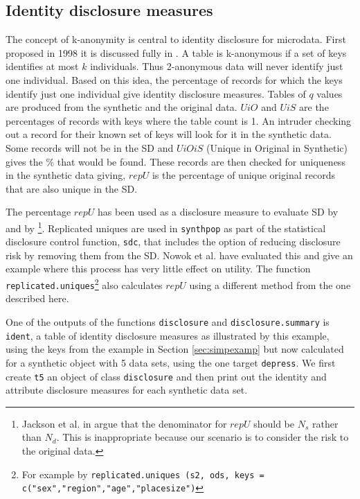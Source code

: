 \documentclass[12pt]{article}
\begin{document}
\subsection{Identity disclosure measures}\label{subsec:ident} 
The concept of k-anonymity is central to identity disclosure for microdata. First proposed in 1998 \cite{kanon1} it is discussed fully in \cite{elliotanonframe}. A table is k-anonymous if a set of keys identifies at most $k$ individuals. Thus 2-anonymous data will never identify just one individual. Based on this idea, the percentage of records for which the keys identify just one individual give identity disclosure measures. 
 Tables of $q$ values are produced from the synthetic and the original data. $UiO$ and $UiS$ are the percentages of records with keys where the table count is 1. An intruder checking out a record for their known set of keys will look for it in the synthetic data. Some records
will not be in the SD and $UiOiS$ (Unique in Original in Synthetic) gives the \% that would be found. These records are then checked for uniqueness in the
synthetic data giving, $repU$ is the percentage of unique original records that are also unique in the SD.

The percentage $repU$ has been used as a disclosure measure to evaluate SD by \cite{jackson_rss} and by \cite{raab22} \footnote{Jackson et al. in \cite{jackson_rss} argue that the denominator for $repU$ should be $N_s$ rather than $N_d$. This is inappropriate because our scenario is to consider the risk to the original data.}.
Replicated uniques are used in \texttt{synthpop} as part of the statistical disclosure control function, \texttt{sdc}, that includes the option of reducing disclosure risk by removing them from the SD. Nowok et al. \cite{nowok_repu} have evaluated this and give an example where this process has very little effect on utility. The function \texttt{replicated.uniques}\footnote{For example by \texttt{replicated.uniques (s2, ods, keys = c("sex","region","age","placesize")} } also calculates $repU$ using a different method from the one described here.

One of the outputs of the functions \texttt{disclosure} and \texttt{disclosure.summary} is \texttt{ident}, a table of identity disclosure measures as illustrated by this example, using the keys from the example in Section \ref{sec:simpexamp} but now calculated for a synthetic object with 5 data sets, using the one target \texttt{depress}. We first create \texttt{t5} an object of class \texttt{disclosure} and then print out the identity and attribute disclosure measures for each synthetic data set.
\end{document}
